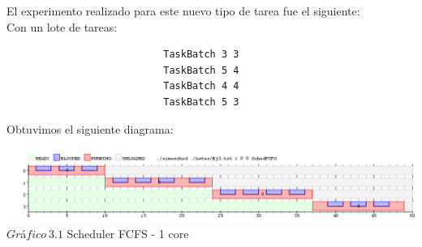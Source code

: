  \indent El experimento realizado para este nuevo tipo de tarea fue el siguiente:\\
 
 Con un lote de tareas:\\
 
 \begin{verbatim}
                           TaskBatch 3 3
                           TaskBatch 5 4
                           TaskBatch 4 4
                           TaskBatch 5 3
 \end{verbatim}

 Obtuvimos el siguiente diagrama:\\
 
 \vspace*{0.3cm} \vspace*{0.3cm}
  \begin{center}
 \includegraphics[scale=0.5]{ej3.png}
 { $Gr$\'a$fico \ 3.1$ Scheduler FCFS - 1 core }
 \end{center}
  \vspace*{0.3cm}
 
